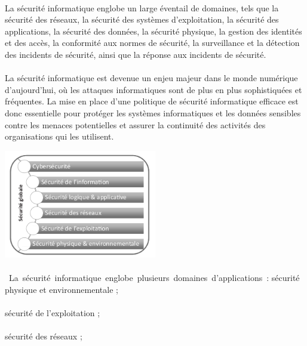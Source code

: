 \documentclass{report}
\begin{document}
 \paragraph{ } La sécurité informatique englobe un large éventail de domaines, tels que la sécurité des réseaux, la sécurité des systèmes d'exploitation, la sécurité des applications, la sécurité des données, la sécurité physique, la gestion des identités et des accès, la conformité aux normes de sécurité, la surveillance et la détection des incidents de sécurité, ainsi que la réponse aux incidents de sécurité.
 
 \paragraph{ }  La sécurité informatique est devenue un enjeu majeur dans le monde numérique d’aujourd’hui, où les attaques informatiques sont de plus en plus sophistiquées et fréquentes. La mise en place d'une politique de sécurité informatique efficace est donc essentielle pour protéger les systèmes informatiques et les données sensibles contre les menaces potentielles et assurer la continuité des activités des organisations qui les utilisent.
 \pagebreak
  
 \hbox{\includegraphics[width=0.5\textwidth]{image_sec.png}}
  \paragraph{ }
 \hbox{ La sécurité informatique englobe plusieurs domaines d'applications :}
 \vspace{5mm}
   \textendash \space   sécurité physique et environnementale ;
  \paragraph{ }
   \textendash \space   sécurité de l’exploitation ;
  \paragraph{ }
   \textendash \space  sécurité des réseaux ;
\end{document}
